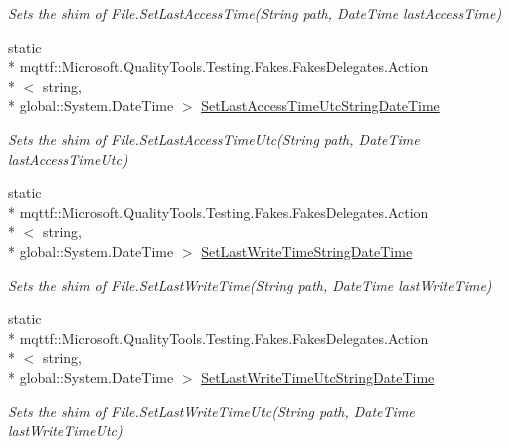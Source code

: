 \begin{DoxyCompactItemize}
\begin{DoxyCompactList}\small\item\em Sets the shim of File.\-Set\-Last\-Access\-Time(\-String path, Date\-Time last\-Access\-Time)\end{DoxyCompactList}\item 
static \\*
mqttf\-::\-Microsoft.\-Quality\-Tools.\-Testing.\-Fakes.\-Fakes\-Delegates.\-Action\\*
$<$ string, \\*
global\-::\-System.\-Date\-Time $>$ \hyperlink{class_system_1_1_i_o_1_1_fakes_1_1_shim_file_ae7f4121d1d2753d44412b68d272072d8}{Set\-Last\-Access\-Time\-Utc\-String\-Date\-Time}
\begin{DoxyCompactList}\small\item\em Sets the shim of File.\-Set\-Last\-Access\-Time\-Utc(\-String path, Date\-Time last\-Access\-Time\-Utc)\end{DoxyCompactList}\item 
static \\*
mqttf\-::\-Microsoft.\-Quality\-Tools.\-Testing.\-Fakes.\-Fakes\-Delegates.\-Action\\*
$<$ string, \\*
global\-::\-System.\-Date\-Time $>$ \hyperlink{class_system_1_1_i_o_1_1_fakes_1_1_shim_file_a0481b1c018a87249ac879353dc896808}{Set\-Last\-Write\-Time\-String\-Date\-Time}
\begin{DoxyCompactList}\small\item\em Sets the shim of File.\-Set\-Last\-Write\-Time(\-String path, Date\-Time last\-Write\-Time)\end{DoxyCompactList}\item 
static \\*
mqttf\-::\-Microsoft.\-Quality\-Tools.\-Testing.\-Fakes.\-Fakes\-Delegates.\-Action\\*
$<$ string, \\*
global\-::\-System.\-Date\-Time $>$ \hyperlink{class_system_1_1_i_o_1_1_fakes_1_1_shim_file_af7a843fba0ac314f723fcecd36f68da8}{Set\-Last\-Write\-Time\-Utc\-String\-Date\-Time}
\begin{DoxyCompactList}\small\item\em Sets the shim of File.\-Set\-Last\-Write\-Time\-Utc(\-String path, Date\-Time last\-Write\-Time\-Utc)\end{DoxyCompactList}\item 

\end{DoxyCompactItemize}
